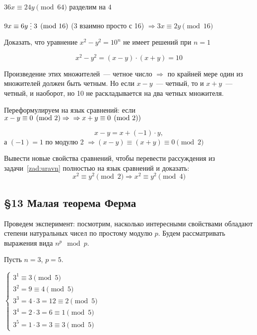 \documentclass[russian]{lecture-notes}
\newcommand{\divs}{\mathrel{\raisebox{-2pt}{\vdots}}}
\begin{document}
\begin{example}
	$36x \equiv 24y \pmod{64}$ разделим на $4$
	
	$9x \equiv 6y\divs 3 \pmod{16}$ (3 взаимно просто с 16)  $\Rightarrow
	3x \equiv 2y \pmod{16}$
\end{example}

\begin{problem*}
	Доказать, что уравнение $x^2 - y^2 = 10^n$ не имеет решений при $n=1$
	
	\[ x^2 - y^2 = (x-y) \cdot (x+y) = 10 \]
	
	Произведение этих множителей~--- четное число $\Rightarrow$  по крайней мере один из множителей должен быть четным. Но если $x-y$~--- четный, то и $x+y$~--- четный, и наоборот, но 10 не раскладывается на два четных множителя.
	
	Переформулируем на язык сравнений: если $x-y \equiv 0 \pmod 2 \Rightarrow \\ \Rightarrow x+y \equiv 0 \pmod 2)$ 
	
	\[ x-y=x+(-1) \cdot y, \] а $(-1)=1$ по модулю 2 $\Rightarrow (x-y) \equiv (x+y) \equiv 0 \pmod 2$
	\label{zad:uravn} 
\end{problem*}

\begin{problem*}
	Вывести новые свойства сравнений, чтобы перевести рассуждения из задачи~\ref{zad:uravn} полностью на язык сравнений и доказать:
	\[
		x^2 \equiv y^2 \pmod 2 \Rightarrow x^2 \equiv y^2 \pmod 4
	\]
\end{problem*}

\begin{center}
	\section*{\LARGE\S 13 Малая теорема Ферма}
	\label{par:teorFerma}
\end{center}

Проведем эксперимент: посмотрим, насколько интересными свойствами обладают степени натуральных чисел по простому модулю $p$. Будем рассматривать выражения вида $n^p \mod p$.

\begin{example*}
	Пусть $n=3$, $p=5$.
	
	$\begin{cases}
		3^1 \equiv 3 \pmod 5
		\\
		3^2 = 9 \equiv 4 \pmod 5
		\\
		3^3 = 4 \cdot 3 = 12 \equiv 2 \pmod 5
		\\
		3^4 = 2 \cdot 3 = 6 \equiv 1 \pmod 5
		\\
		3^5 = 1 \cdot 3 = 3 \equiv 3 \pmod 5
	\end{cases}$
	\label{exp:sravn1}
\end{example*}
\end{document}
